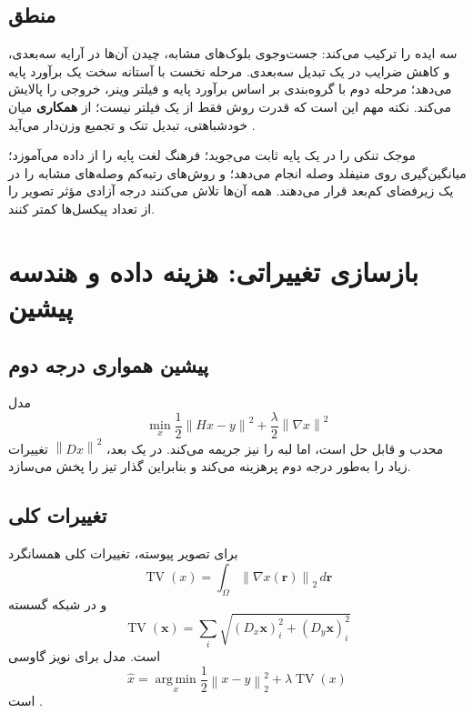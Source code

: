 \documentclass[12pt,openany,oneside]{book}
\newcommand{\norm}[1]{\left\lVert #1\right\rVert}
\newcommand{\vect}[1]{\bm{#1}}
\newcommand{\argmin}{\operatorname*{arg\,min}}
\begin{document}
\subsection{منطق }
 سه ایده را ترکیب می‌کند: جست‌وجوی بلوک‌های مشابه، چیدن آن‌ها در آرایه سه‌بعدی، و کاهش ضرایب در یک تبدیل سه‌بعدی.
مرحله نخست با آستانه سخت یک برآورد پایه می‌دهد؛ مرحله دوم با گروه‌بندی بر اساس برآورد پایه و فیلتر وینر، خروجی را پالایش می‌کند.
نکته مهم این است که قدرت روش فقط از یک فیلتر نیست؛ از \textbf{همکاری} میان خودشباهتی، تبدیل تنک و تجمیع وزن‌دار می‌آید \cite{dabov2007bm3d}.

\begin{keybox}
موجک تنکی را در یک پایه ثابت می‌جوید؛ فرهنگ لغت پایه را از داده می‌آموزد؛  میانگین‌گیری روی منیفلد وصله انجام می‌دهد؛
و روش‌های رتبه‌کم وصله‌های مشابه را در یک زیرفضای کم‌بعد قرار می‌دهند. همه آن‌ها تلاش می‌کنند درجه آزادی مؤثر تصویر را از تعداد پیکسل‌ها کمتر کنند.
\end{keybox}

\section{بازسازی تغییراتی: هزینه داده و هندسه پیشین}

\subsection{پیشین همواری درجه دوم}
مدل
\begin{equation}
\min_x\frac12\norm{Hx-y}^2+\frac\lambda2\norm{\nabla x}^2
\end{equation}
محدب و قابل حل است، اما لبه را نیز جریمه می‌کند. در یک بعد، \(\norm{Dx}^2\) تغییرات زیاد را به‌طور درجه دوم پرهزینه می‌کند و بنابراین گذار تیز را پخش می‌سازد.

\subsection{تغییرات کلی}
برای تصویر پیوسته، تغییرات کلی همسانگرد
\begin{equation}
\operatorname{TV}(x)=\int_\Omega\norm{\nabla x(\vect r)}_2\,d\vect r
\end{equation}
و در شبکه گسسته
\begin{equation}
\operatorname{TV}(\vect x)=\sum_i\sqrt{(D_x\vect x)_i^2+(D_y\vect x)_i^2}
\label{eq:tv}
\end{equation}
است. مدل  برای نویز گاوسی
\begin{equation}
\widehat x=\argmin_x\frac12\norm{x-y}_2^2+\lambda\operatorname{TV}(x)
\label{eq:rof}
\end{equation}
است \cite{rudin1992tv}.
\end{document}
